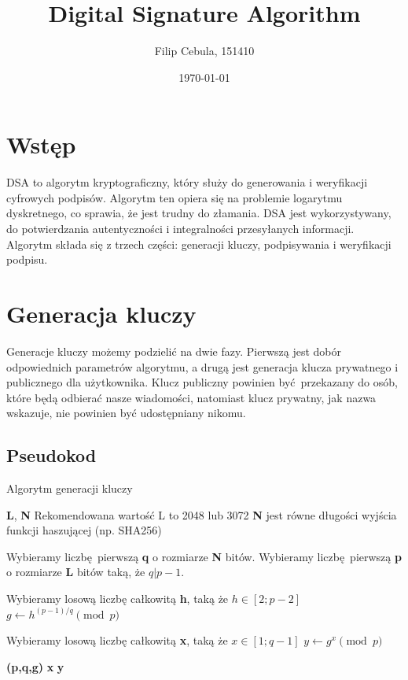 \documentclass[11pt]{article}
\title{Digital Signature Algorithm}
\author{Filip Cebula, 151410}
\date{\today}
\begin{document}
\maketitle
\pagebreak

\section{Wstęp}
DSA to algorytm kryptograficzny, który służy do generowania i weryfikacji
cyfrowych podpisów. Algorytm ten opiera się na problemie logarytmu
dyskretnego, co sprawia, że jest trudny do złamania. DSA jest
wykorzystywany, do potwierdzania autentyczności i integralności przesyłanych
informacji. Algorytm składa się z trzech części: generacji kluczy, podpisywania
i weryfikacji podpisu.

\section{Generacja kluczy}
Generacje kluczy możemy podzielić na dwie fazy. Pierwszą jest dobór
odpowiednich parametrów algorytmu, a drugą jest generacja klucza prywatnego
i publicznego dla użytkownika. Klucz publiczny powinien być przekazany do osób,
które będą odbierać nasze wiadomości, natomiast klucz prywatny, jak nazwa
wskazuje, nie powinien być udostępniany nikomu.

\subsection{Pseudokod}
\begin{algorithm}
\caption{Algorytm generacji kluczy}\label{alg:cap}
  \begin{algorithmic}[1]
    \Require \textbf{L}, \textbf{N}
    \Comment Rekomendowana wartość L to 2048 lub 3072
    \Ensure \textbf{N} jest równe długości wyjścia funkcji haszującej
      (np. SHA256)

    \State Wybieramy liczbę pierwszą \textbf{q} o rozmiarze \textbf{N} bitów.
    \State Wybieramy liczbę pierwszą \textbf{p} o rozmiarze \textbf{L} bitów
      taką, że $q|p-1$.

    \Repeat
      \State Wybieramy losową liczbę całkowitą \textbf{h}, taką że $h \in [2;p-2]$
      \State $g \gets h^{(p-1)/q} \pmod p$

    \State Wybieramy losową liczbę całkowitą \textbf{x}, taką że $x \in [1;q-1]$
    \State $y \gets g^{x} \pmod p$

    \State \Return \textbf{(p,q,g)}
    \State \Return \textbf{x}
    \State \Return \textbf{y}
  \end{algorithmic}
\end{algorithm}
\end{document}
